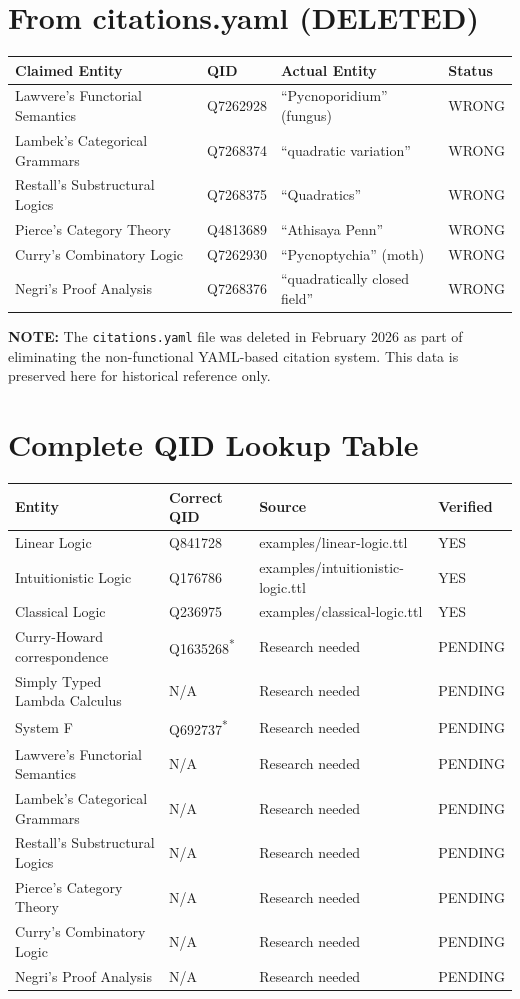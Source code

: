 \section*{From citations.yaml (DELETED)}

\begin{tabular}{llll}
\toprule
\textbf{Claimed Entity} & \textbf{QID} & \textbf{Actual Entity} & \textbf{Status} \\
\midrule
Lawvere's Functorial Semantics & Q7262928 & ``Pycnoporidium'' (fungus) & WRONG \\
Lambek's Categorical Grammars & Q7268374 & ``quadratic variation'' & WRONG \\
Restall's Substructural Logics & Q7268375 & ``Quadratics'' & WRONG \\
Pierce's Category Theory & Q4813689 & ``Athisaya Penn'' & WRONG \\
Curry's Combinatory Logic & Q7262930 & ``Pycnoptychia'' (moth) & WRONG \\
Negri's Proof Analysis & Q7268376 & ``quadratically closed field'' & WRONG \\
\bottomrule
\end{tabular}

\textbf{NOTE:} The \texttt{citations.yaml} file was deleted in February 2026 as part of eliminating the non-functional YAML-based citation system. This data is preserved here for historical reference only.

\section*{Complete QID Lookup Table}

\begin{tabular}{llll}
\toprule
\textbf{Entity} & \textbf{Correct QID} & \textbf{Source} & \textbf{Verified} \\
\midrule
Linear Logic & Q841728 & examples/linear-logic.ttl & YES \\
Intuitionistic Logic & Q176786 & examples/intuitionistic-logic.ttl & YES \\
Classical Logic & Q236975 & examples/classical-logic.ttl & YES \\
Curry-Howard correspondence & Q1635268\textsuperscript{*} & Research needed & PENDING \\
Simply Typed Lambda Calculus & N/A & Research needed & PENDING \\
System F & Q692737\textsuperscript{*} & Research needed & PENDING \\
Lawvere's Functorial Semantics & N/A & Research needed & PENDING \\
Lambek's Categorical Grammars & N/A & Research needed & PENDING \\
Restall's Substructural Logics & N/A & Research needed & PENDING \\
Pierce's Category Theory & N/A & Research needed & PENDING \\
Curry's Combinatory Logic & N/A & Research needed & PENDING \\
Negri's Proof Analysis & N/A & Research needed & PENDING \\
\bottomrule
\end{tabular}

